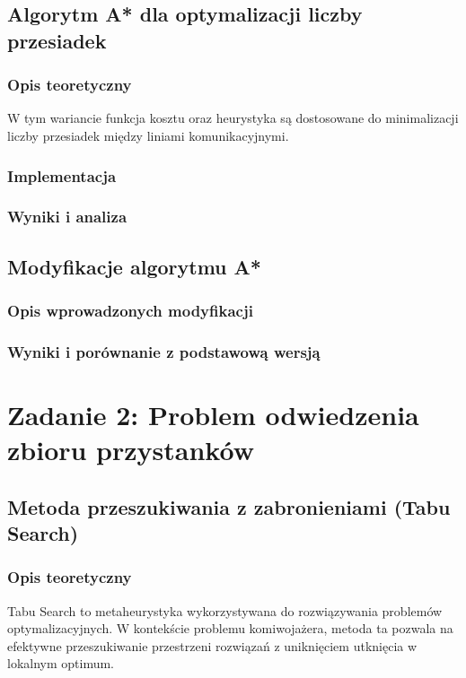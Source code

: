 \documentclass[12pt,a4paper]{article}
\begin{document}
\subsection{Algorytm A* dla optymalizacji liczby przesiadek}
\subsubsection{Opis teoretyczny}
W tym wariancie funkcja kosztu oraz heurystyka są dostosowane do minimalizacji liczby przesiadek między liniami komunikacyjnymi.

\subsubsection{Implementacja}

\subsubsection{Wyniki i analiza}

\subsection{Modyfikacje algorytmu A*}
\subsubsection{Opis wprowadzonych modyfikacji}

\subsubsection{Wyniki i porównanie z podstawową wersją}

\section{Zadanie 2: Problem odwiedzenia zbioru przystanków}
\subsection{Metoda przeszukiwania z zabronieniami (Tabu Search)}
\subsubsection{Opis teoretyczny}
Tabu Search to metaheurystyka wykorzystywana do rozwiązywania problemów optymalizacyjnych. W kontekście problemu komiwojażera, metoda ta pozwala na efektywne przeszukiwanie przestrzeni rozwiązań z uniknięciem utknięcia w lokalnym optimum.
\end{document}
